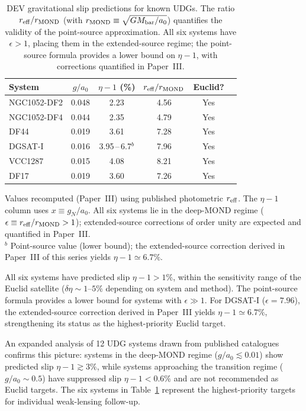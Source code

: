 \documentclass[aps,prd,twocolumn,showpacs,superscriptaddress]{revtex4-2}
\newcommand{\aO}{a_0}
\begin{document}
\begin{table}[h]
\caption{DEV gravitational slip predictions for known UDGs.
The ratio $r_{\rm eff}/r_{\rm MOND}$ (with
$r_{\rm MOND}\equiv\sqrt{GM_{\rm bar}/\aO}$) quantifies the validity
of the point-source approximation. All six systems have
$\epsilon > 1$, placing them in the extended-source regime;
the point-source formula provides a lower bound on $\eta-1$,
with corrections quantified in Paper~III.}
\label{tab:udg}
\begin{ruledtabular}
\begin{tabular}{lccccc}
System & $g/\aO$ & $\eta-1$ (\%) & $r_{\rm eff}/r_{\rm MOND}$ & Euclid? \\
\hline
NGC1052-DF2 & 0.048 & 2.23 & 4.56 & Yes \\
NGC1052-DF4 & 0.044 & 2.35 & 4.79 & Yes \\
DF44        & 0.019 & 3.61 & 7.28 & Yes \\
DGSAT-I     & 0.016 & 3.95\,--\,6.7$^{b}$ & 7.96 & Yes \\
VCC1287     & 0.015 & 4.08 & 8.21 & Yes \\
DF17        & 0.019 & 3.60 & 7.26 & Yes \\
\end{tabular}
\end{ruledtabular}
{\small Values recomputed (Paper~III) using published
photometric $r_{\rm eff}$. The $\eta-1$ column uses
$x \equiv g_N/\aO$. All six systems lie in the deep-MOND
regime ($\epsilon \equiv r_{\rm eff}/r_{\rm MOND}>1$);
extended-source corrections of order unity are expected and
quantified in Paper~III.\\
$^{b}$ Point-source value (lower bound); the extended-source
correction derived in Paper~III of this series yields
$\eta-1 \simeq 6.7\%$.}
\end{table}

All six systems have predicted slip $\eta - 1 > 1\%$,
within the sensitivity range of the Euclid satellite
($\delta\eta \sim 1$--$5\%$ depending on system and method).
The point-source formula provides a lower bound for systems
with $\epsilon \gg 1$. For DGSAT-I ($\epsilon = 7.96$), the
extended-source correction derived in Paper~III yields
$\eta-1 \simeq 6.7\%$, strengthening its status as the
highest-priority Euclid target.

An expanded analysis of 12 UDG systems drawn from published
catalogues \cite{vanDokkum2015,Lelli2016} confirms this
picture: systems in the deep-MOND regime ($g/\aO \lesssim 0.01$)
show predicted slip $\eta - 1 \gtrsim 3\%$, while systems
approaching the transition regime ($g/\aO \sim 0.5$) have
suppressed slip $\eta - 1 < 0.6\%$ and are not recommended
as Euclid targets. The six systems in Table~\ref{tab:udg}
represent the highest-priority targets for individual
weak-lensing follow-up.
\end{document}
